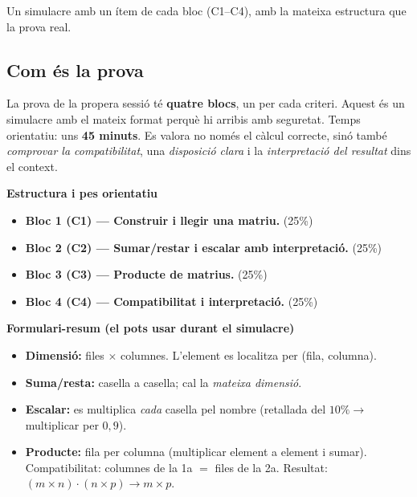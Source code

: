 %
{Un simulacre amb un ítem de cada bloc (C1–C4), amb la mateixa estructura que la prova real.}

\subsection*{Com és la prova}

La prova de la propera sessió té \textbf{quatre blocs}, un per cada criteri. Aquest
és un simulacre amb el mateix format perquè hi arribis amb seguretat. Temps
orientatiu: uns \textbf{45 minuts}. Es valora no només el càlcul correcte, sinó
també \emph{comprovar la compatibilitat}, una \emph{disposició clara} i la
\emph{interpretació del resultat} dins el context.

\begin{idea}
\textbf{Estructura i pes orientatiu}
\begin{itemize}[leftmargin=1.4em, itemsep=2pt]
  \item \textbf{Bloc 1 (C1) — Construir i llegir una matriu.} \;(25\%)
  \item \textbf{Bloc 2 (C2) — Sumar/restar i escalar amb interpretació.} \;(25\%)
  \item \textbf{Bloc 3 (C3) — Producte de matrius.} \;(25\%)
  \item \textbf{Bloc 4 (C4) — Compatibilitat i interpretació.} \;(25\%)
\end{itemize}
\end{idea}

\begin{idea}
\textbf{Formulari-resum (el pots usar durant el simulacre)}
\begin{itemize}[leftmargin=1.4em, itemsep=2pt]
  \item \textbf{Dimensió:} files $\times$ columnes. L'element es localitza per
        (fila, columna).
  \item \textbf{Suma/resta:} casella a casella; cal la \emph{mateixa dimensió}.
  \item \textbf{Escalar:} es multiplica \emph{cada} casella pel nombre (retallada
        del $10\%\rightarrow$ multiplicar per $0{,}9$).
  \item \textbf{Producte:} fila per columna (multiplicar element a element i sumar).
        Compatibilitat: columnes de la 1a $=$ files de la 2a. Resultat:
        $(m\times n)\cdot(n\times p)\rightarrow m\times p$.
\end{itemize}
\end{idea}

